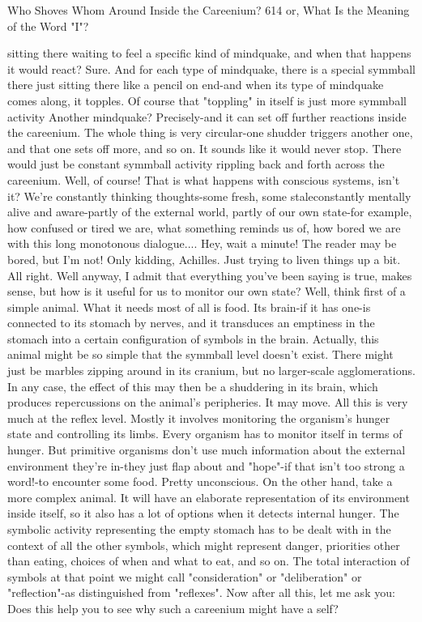 Who Shoves Whom Around Inside the Careenium?                                        614
or, What Is the Meaning of the Word "I"?

  sitting there waiting to feel a specific kind of mindquake, and when that happens it
  would react?
\tortoise Sure. And for each type of mindquake, there is a special symmball there
  just sitting there like a pencil on end-and when its type of mindquake comes along,
  it topples. Of course that "toppling" in itself is just more symmball activity
\achilles Another mindquake?
\tortoise Precisely-and it can set off further reactions inside the careenium. The
  whole thing is very circular-one shudder triggers another one, and that one sets off
  more, and so on.
\achilles It sounds like it would never stop. There would just be constant
  symmball activity rippling back and forth across the careenium.
\tortoise Well, of course! That is what happens with conscious systems, isn't it?
  We're constantly thinking thoughts-some fresh, some staleconstantly mentally alive
  and aware-partly of the external world, partly of our own state-for example, how
  confused or tired we are, what something reminds us of, how bored we are with
  this long monotonous dialogue....
\achilles Hey, wait a minute! The reader may be bored, but I'm not!
\tortoise Only kidding, Achilles. Just trying to liven things up a bit.
\achilles All right. Well anyway, I admit that everything you've been saying is
  true, makes sense, but how is it useful for us to monitor our own state?
\tortoise Well, think first of a simple animal. What it needs most of all is food. Its
  brain-if it has one-is connected to its stomach by nerves, and it transduces an
  emptiness in the stomach into a certain configuration of symbols in the brain.
  Actually, this animal might be so simple that the symmball level doesn't exist.
  There might just be marbles zipping around in its cranium, but no larger-scale
  agglomerations. In any case, the effect of this may then be a shuddering in its
  brain, which produces repercussions on the animal's peripheries. It may move. All
  this is very much at the reflex level. Mostly it involves monitoring the organism's
  hunger state and controlling its limbs. Every organism has to monitor itself in
  terms of hunger. But primitive organisms don't use much information about the
  external environment they're in-they just flap about and "hope"-if that isn't too
  strong a word!-to encounter some food. Pretty unconscious. On the other hand,
  take a more complex animal. It will have an elaborate representation of its
  environment inside itself, so it also has a lot of options when it detects internal
  hunger. The symbolic activity representing the empty stomach has to be dealt with
  in the context of all the other symbols, which might represent danger, priorities
  other than eating, choices of when and what to eat, and so on. The total interaction
  of symbols at that point we might call "consideration" or "deliberation" or
  "reflection"-as distinguished from "reflexes". Now after all this, let me ask you:
  Does this help you to see why such a careenium might have a self?




